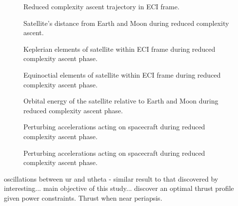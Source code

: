 \begin{figure}
\centering
\def\svgwidth{\figurewidth}

\caption{Reduced complexity ascent trajectory in ECI frame.}
\label{fig:Ascent2-3D}
\end{figure}

\begin{figure}
\centering
\def\svgwidth{\figurewidth}

\caption{Satellite's distance from Earth and Moon during reduced complexity ascent.}
\label{fig:Ascent2-dist}
\end{figure}

\begin{figure}
\centering
\def\svgwidth{\figurewidth}

\caption{Keplerian elements of satellite within ECI frame during reduced complexity ascent phase.}
\label{fig:Ascent2-kep}
\end{figure}

\begin{figure}
\centering
\def\svgwidth{\figurewidth}

\caption{Equinoctial elements of satellite within ECI frame during reduced complexity ascent phase.}
\label{fig:Ascent2-mee}
\end{figure}

\begin{figure}
\centering
\def\svgwidth{\figurewidth}

\caption{Orbital energy of the satellite relative to Earth and Moon during reduced complexity ascent phase.}
\label{fig:Ascent2-orbeng}
\end{figure}

\begin{figure}
\centering
\def\svgwidth{\figurewidth}

\caption{Perturbing accelerations acting on spacecraft during reduced complexity ascent phase.}
\label{fig:Ascent2-pert}
\end{figure}

\begin{figure}
\centering
\def\svgwidth{\figurewidth}

\caption{Perturbing accelerations acting on spacecraft during reduced complexity ascent phase.}
\label{fig:Ascent2-pert2}
\end{figure}

oscillations between ur and utheta - similar result to that discovered by \textcite{Betts2003}
interesting... main objective of this study... discover an optimal thrust profile given power constraints. Thrust when near periapsis.

